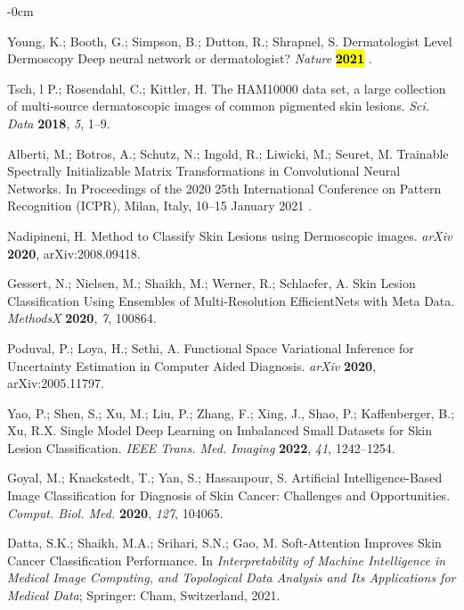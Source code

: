 \documentclass[sensors,article,accept,pdftex,moreauthors]{Definitions/mdpi}
\begin{document}
\begin{adjustwidth}{-\extralength}{0cm}
\begin{thebibliography}{999}
Young, K.; Booth, G.; Simpson, B.; Dutton, R.; Shrapnel, S.  Dermatologist Level Dermoscopy Deep neural network or dermatologist? {\em Nature} 
{\bf \hl{2021}%
}.

Tsch, l P.; Rosendahl, C.; Kittler, H. The HAM10000 data set, a large collection of multi-source dermatoscopic images of common pigmented skin lesions. 
{\em Sci. Data} 
{\bf 2018}, \emph{5}, 1--9.

Alberti, M.; Botros, A.; Schutz, N.; Ingold, R.; Liwicki, M.; Seuret, M. Trainable Spectrally Initializable Matrix Transformations in Convolutional Neural Networks. In Proceedings of the 2020 25th International Conference on Pattern Recognition (ICPR), Milan, Italy, 10--15 January 2021 .

Nadipineni, H. Method to Classify Skin Lesions using Dermoscopic images. {\em arXiv} 
{\bf 2020}, arXiv:2008.09418.

Gessert, N.; Nielsen, M.; Shaikh, M.; Werner, R.; Schlaefer, A. Skin Lesion Classification Using Ensembles of Multi-Resolution EfficientNets with Meta Data. 
{\em MethodsX} 
{\bf 2020}, \emph{7}, 100864.

Poduval, P.; Loya, H.; Sethi, A. Functional Space Variational Inference for Uncertainty Estimation in Computer Aided Diagnosis. 
{\em arXiv} 
{\bf 2020}, arXiv:2005.11797.




Yao, P.; Shen, S.; Xu, M.; Liu, P.; Zhang, F.;  Xing, J., Shao, P.; Kaffenberger, B.; Xu, R.X. 
Single Model Deep Learning on Imbalanced Small Datasets for Skin Lesion Classification. 
{\em IEEE Trans. Med. Imaging} 
{\bf 2022}, \emph{41}, 1242--1254.

Goyal, M.; Knackstedt, T.; Yan, S.; Hassanpour, S.  Artificial Intelligence-Based Image Classification for Diagnosis of Skin Cancer: Challenges and Opportunities. 
{\em Comput. Biol. Med.} 
{\bf 2020}, \emph{127}, 104065.

Datta, S.K.; Shaikh, M.A.; Srihari, S.N.; Gao, M. Soft-Attention Improves Skin Cancer Classification Performance. In \emph{Interpretability of Machine Intelligence in Medical Image Computing, and Topological Data Analysis and Its Applications for Medical Data}; Springer: Cham, Switzerland, 
{2021}.


\end{thebibliography}
\end{adjustwidth}
\end{document}
